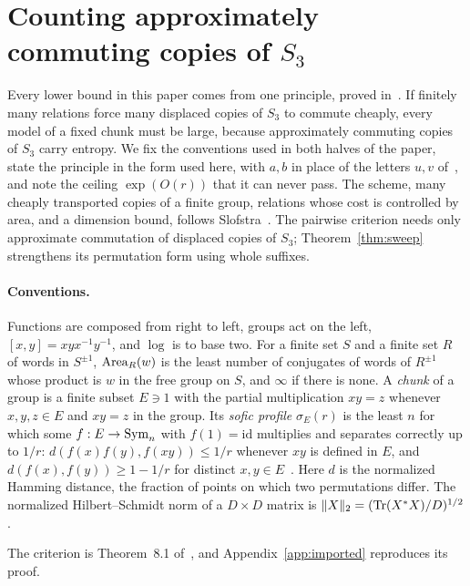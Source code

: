 \section{Counting approximately commuting copies of \texorpdfstring{$S_3$}{S3}}\label{sec:criterion}

Every lower bound in this paper comes from one principle, proved in~\cite{DouglasMghirbiA}. If finitely many relations force many displaced
copies of $S_3$ to commute cheaply, every model of a fixed chunk must be large, because approximately commuting copies of $S_3$ carry
entropy. We fix the conventions used in both halves of the paper, state the principle in the form used here, with $a,b$ in place of the
letters $u,v$ of~\cite{DouglasMghirbiA}, and note the ceiling $\exp(O(r))$ that it can never pass. The scheme, many cheaply transported
copies of a finite group, relations whose cost is controlled by area, and a dimension bound, follows Slofstra~\cite[Sections~2--3]{Slofstra2018}.
The pairwise criterion needs only approximate commutation of displaced copies of $S_3$; Theorem~\ref{thm:sweep} strengthens its permutation form using whole suffixes.

\paragraph{Conventions.} Functions are composed from right to left, groups act on the left, $[x,y]=xyx^{-1}y^{-1}$, and $\log$ is to base
two. For a finite set $S$ and a finite set $R$ of words in $S^{\pm1}$, $\operatorname{Area}_R(w)$ is the least number of conjugates of words of $R^{\pm1}$
whose product is $w$ in the free group on $S$, and $\infty$ if there is none. A \emph{chunk} of a group is a finite subset $E\ni1$ with the
partial multiplication $xy=z$ whenever $x,y,z\in E$ and $xy=z$ in the group. Its \emph{sofic profile} $\sigma_E(r)$ is the least $n$ for which
some $f:E\to\operatorname{Sym}_n$ with $f(1)=\mathrm{id}$ multiplies and separates correctly up to $1/r$: $d(f(x)f(y),f(xy))\le1/r$ whenever $xy$ is defined in
$E$, and $d(f(x),f(y))\ge1-1/r$ for distinct $x,y\in E$~\cite{Cornulier2013}. Here $d$ is the normalized Hamming distance, the fraction of points
on which two permutations differ. The normalized Hilbert--Schmidt norm of a $D\times D$ matrix is $\|X\|_2=(\operatorname{Tr}(X^*X)/D)^{1/2}$.

The criterion is Theorem~8.1 of~\cite{DouglasMghirbiA}, and Appendix~\ref{app:imported} reproduces its proof.

